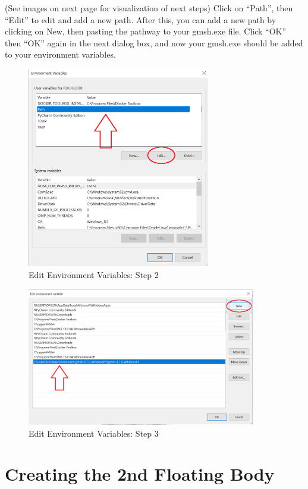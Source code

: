 \documentclass{report}
\begin{document}
\noindent (See images on next page for visualization of next steps) Click on ``Path'', then ``Edit'' to edit and add a new path. After this, you can add a new path by clicking on New, then pasting the pathway to your gmsh.exe file. Click ``OK'' then ``OK'' again in the next dialog box, and now your gmsh.exe should be added to your environment variables.

\newpage

\begin{figure}[h]
  \centering
  \includegraphics[width=8cm]{EditEnviron2.png}
  \setcaptionwidth{10cm}
  \caption{Edit Environment Variables: Step 2}
  \label{TSDA_connected_bodies}
\end{figure}
\begin{figure}[h]
  \centering
  \includegraphics[width=10cm]{EditEnviron3.png}
  \setcaptionwidth{10cm}
  \caption{Edit Environment Variables: Step 3}
  \label{TSDA_connected_bodies}
\end{figure}

\newpage
\section{Creating the 2nd Floating Body}
\end{document}
